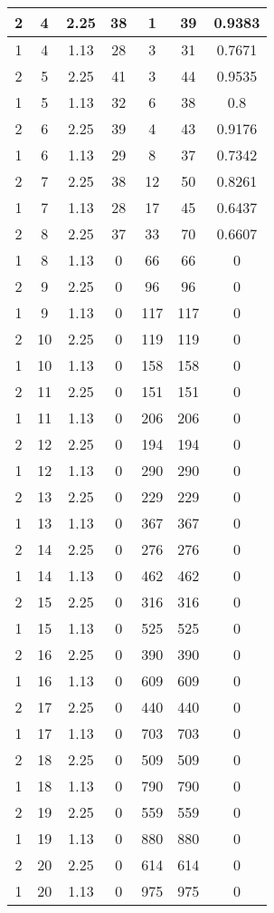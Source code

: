 \documentclass[letterpaper, 12pt]{article}
\begin{document}
\begin{longtable}{|c|c|c|c|c|c|c|}
\hline
2 & 4 & 2.25 & 38 & 1 & 39 & 0.9383 \\
\hline
1 & 4 & 1.13 & 28 & 3 & 31 & 0.7671 \\
\hline
2 & 5 & 2.25 & 41 & 3 & 44 & 0.9535 \\
\hline
1 & 5 & 1.13 & 32 & 6 & 38 & 0.8 \\
\hline
2 & 6 & 2.25 & 39 & 4 & 43 & 0.9176 \\
\hline
1 & 6 & 1.13 & 29 & 8 & 37 & 0.7342 \\
\hline
2 & 7 & 2.25 & 38 & 12 & 50 & 0.8261 \\
\hline
1 & 7 & 1.13 & 28 & 17 & 45 & 0.6437 \\
\hline
2 & 8 & 2.25 & 37 & 33 & 70 & 0.6607 \\
\hline
1 & 8 & 1.13 & 0 & 66 & 66 & 0 \\
\hline
2 & 9 & 2.25 & 0 & 96 & 96 & 0 \\
\hline
1 & 9 & 1.13 & 0 & 117 & 117 & 0 \\
\hline
2 & 10 & 2.25 & 0 & 119 & 119 & 0 \\
\hline
1 & 10 & 1.13 & 0 & 158 & 158 & 0 \\
\hline
2 & 11 & 2.25 & 0 & 151 & 151 & 0 \\
\hline
1 & 11 & 1.13 & 0 & 206 & 206 & 0 \\
\hline
2 & 12 & 2.25 & 0 & 194 & 194 & 0 \\
\hline
1 & 12 & 1.13 & 0 & 290 & 290 & 0 \\
\hline
2 & 13 & 2.25 & 0 & 229 & 229 & 0 \\
\hline
1 & 13 & 1.13 & 0 & 367 & 367 & 0 \\
\hline
2 & 14 & 2.25 & 0 & 276 & 276 & 0 \\
\hline
1 & 14 & 1.13 & 0 & 462 & 462 & 0 \\
\hline
2 & 15 & 2.25 & 0 & 316 & 316 & 0 \\
\hline
1 & 15 & 1.13 & 0 & 525 & 525 & 0 \\
\hline
2 & 16 & 2.25 & 0 & 390 & 390 & 0 \\
\hline
1 & 16 & 1.13 & 0 & 609 & 609 & 0 \\
\hline
2 & 17 & 2.25 & 0 & 440 & 440 & 0 \\
\hline
1 & 17 & 1.13 & 0 & 703 & 703 & 0 \\
\hline
2 & 18 & 2.25 & 0 & 509 & 509 & 0 \\
\hline
1 & 18 & 1.13 & 0 & 790 & 790 & 0 \\
\hline
2 & 19 & 2.25 & 0 & 559 & 559 & 0 \\
\hline
1 & 19 & 1.13 & 0 & 880 & 880 & 0 \\
\hline
2 & 20 & 2.25 & 0 & 614 & 614 & 0 \\
\hline
1 & 20 & 1.13 & 0 & 975 & 975 & 0 \\
\hline
\end{longtable}
\end{document}
